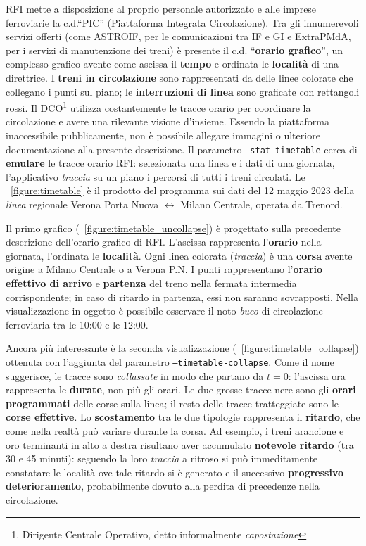 \documentclass[12pt,italian]{report}
\begin{document}
RFI mette a disposizione al proprio personale autorizzato e alle
imprese ferroviarie la c.d.\@ ``PIC'' (Piattaforma Integrata
Circolazione).  Tra gli innumerevoli servizi offerti \cite{RfiPic}
(come ASTROIF, per le comunicazioni tra IF e GI e ExtraPMdA, per i
servizi di manutenzione dei treni) è presente il c.d.\@
``\textbf{orario grafico}'', un complesso grafico avente come ascissa
il \textbf{tempo} e ordinata le \textbf{località} di una direttrice.
I \textbf{treni in circolazione} sono rappresentati da delle linee
colorate che collegano i punti sul piano; le \textbf{interruzioni di
    linea} sono graficate con rettangoli rossi.  Il
DCO\footnote{Dirigente Centrale Operativo, detto informalmente
    \textit{capostazione}} utilizza costantemente le tracce orario per
coordinare la circolazione e avere una rilevante visione d'insieme.
Essendo la piattaforma inaccessibile pubblicamente, non è possibile
allegare immagini o ulteriore documentazione alla presente
descrizione.  Il parametro \texttt{--stat timetable} cerca di
\textbf{emulare} le tracce orario RFI: selezionata una linea e i dati
di una giornata, l'applicativo \textit{traccia} su un piano i percorsi
di tutti i treni circolati.  Le \figurename~\ref{figure:timetable} è
il prodotto del programma sui dati del 12 maggio 2023 della
\textit{linea} regionale Verona Porta Nuova $\leftrightarrow$ Milano
Centrale, operata da Trenord.

Il primo grafico (\figurename~\ref{figure:timetable_uncollapse}) è
progettato sulla precedente descrizione dell'orario grafico di RFI.
L'ascissa rappresenta l'\textbf{orario} nella giornata, l'ordinata le
\textbf{località}.  Ogni linea colorata (\textit{traccia}) è una
\textbf{corsa} avente origine a Milano Centrale o a Verona P.N\@.  I
punti rappresentano l'\textbf{orario effettivo di arrivo} e
\textbf{partenza} del treno nella fermata intermedia corrispondente;
in caso di ritardo in partenza, essi non saranno sovrapposti.  Nella
visualizzazione in oggetto è possibile osservare il noto \textit{buco}
di circolazione ferroviaria tra le 10:00 e le 12:00.

Ancora più interessante è la seconda visualizzazione
(\figurename~\ref{figure:timetable_collapse}) ottenuta con l'aggiunta
del parametro \texttt{--timetable-\-collapse}.  Come il nome
suggerisce, le tracce sono \textit{collassate} in modo che partano da
$t = 0$: l'ascissa ora rappresenta le \textbf{durate}, non più gli
orari.  Le due grosse tracce nere sono gli \textbf{orari programmati}
delle corse sulla linea; il resto delle tracce tratteggiate sono le
\textbf{corse effettive}.  Lo \textbf{scostamento} tra le due
tipologie rappresenta il \textbf{ritardo}, che come nella realtà può
variare durante la corsa.  Ad esempio, i treni arancione e oro
terminanti in alto a destra risultano aver accumulato \textbf{notevole
    ritardo} (tra 30 e 45 minuti): seguendo la loro \textit{traccia} a
ritroso si può immeditamente constatare le località ove tale ritardo
si è generato e il successivo \textbf{progressivo deterioramento},
probabilmente dovuto alla perdita di precedenze nella circolazione.
\end{document}
